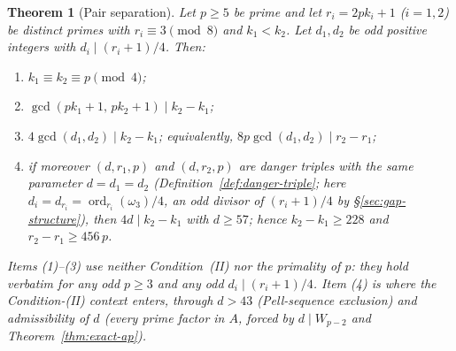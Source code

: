 \documentclass[11pt]{amsart}
\theoremstyle{plain}
\newtheorem{theorem}{Theorem}[section]
\theoremstyle{definition}
\theoremstyle{remark}
\numberwithin{equation}{section}
\newcommand{\ord}{\operatorname{ord}}
\begin{document}
\begin{theorem}[Pair separation]\label{thm:pair-separation}
Let $p \geq 5$ be prime and let $r_i = 2 p k_i + 1$ ($i = 1, 2$) be distinct primes with $r_i \equiv 3 \pmod 8$ and $k_1 < k_2$. Let $d_1, d_2$ be odd positive integers with $d_i \mid (r_i + 1)/4$. Then:
\begin{enumerate}
\item $k_1 \equiv k_2 \equiv p \pmod 4$;
\item $\gcd(p k_1 + 1,\, p k_2 + 1) \mid k_2 - k_1$;
\item $4 \gcd(d_1, d_2) \mid k_2 - k_1$; equivalently, $8 p \gcd(d_1, d_2) \mid r_2 - r_1$;
\item if moreover $(d, r_1, p)$ and $(d, r_2, p)$ are danger triples with the same parameter $d = d_1 = d_2$ (Definition~\ref{def:danger-triple}; here $d_i = d_{r_i} = \ord_{r_i}(\omega_3)/4$, an odd divisor of $(r_i+1)/4$ by \S\ref{sec:gap-structure}), then $4 d \mid k_2 - k_1$ with $d \geq 57$; hence $k_2 - k_1 \geq 228$ and $r_2 - r_1 \geq 456\, p$.
\end{enumerate}
Items (1)--(3) use neither Condition~(II) nor the primality of $p$: they hold verbatim for any odd $p \geq 3$ and any odd $d_i \mid (r_i + 1)/4$. Item (4) is where the Condition-(II) context enters, through $d > 43$ (Pell-sequence exclusion) and admissibility of $d$ (every prime factor in $A$, forced by $d \mid W_{p-2}$ and Theorem~\ref{thm:exact-ap}).
\end{theorem}
\end{document}
